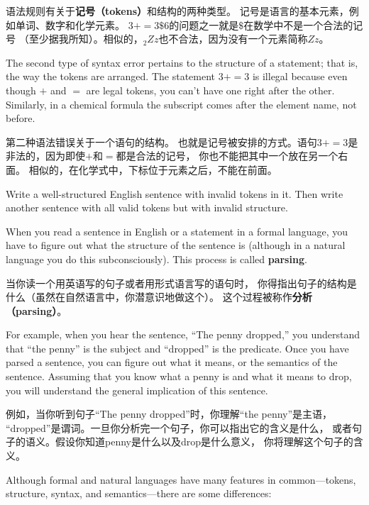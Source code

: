 \documentclass[10pt]{book}
\begin{document}
\begin{CJK}{UTF8}{gbsn}
语法规则有关于{\bf 记号（tokens）}和结构的两种类型。
记号是语言的基本元素，例如单词、数字和化学元素。
$3 + = 3 \mbox{\$} 6$的问题之一就是\( \$ \)在数学中不是一个合法的记号
（至少据我所知）。相似的，$_2Zz$也不合法，因为没有一个元素简称$Zz$。

The second type of syntax error pertains to the structure of a
statement; that is, the way the tokens are arranged.  The statement
$3 + = 3$ is illegal because even though $+$ and $=$ are
legal tokens, you can't have one right after the other.  Similarly,
in a chemical formula the subscript comes after the element name, not
before.

第二种语法错误关于一个语句的结构。
也就是记号被安排的方式。语句$3 + = 3$是非法的，因为即使$+$和$=$都是合法的记号，
你也不能把其中一个放在另一个右面。
相似的，在化学式中，下标位于元素之后，不能在前面。

\begin{exercise}

Write a well-structured English
sentence with invalid tokens in it.  Then write another sentence
with all valid tokens but with invalid structure.

\end{exercise}

When you read a sentence in English or a statement in a formal
language, you have to figure out what the structure of the sentence is
(although in a natural language you do this subconsciously).  This
process is called {\bf parsing}.

当你读一个用英语写的句子或者用形式语言写的语句时，
你得指出句子的结构是什么（虽然在自然语言中，你潜意识地做这个）。
这个过程被称作{\bf 分析（parsing）}。

For example, when you hear the sentence, ``The penny dropped,'' you
understand that ``the penny'' is the subject and ``dropped'' is the
predicate.  Once you have parsed a sentence, you can figure out what it
means, or the semantics of the sentence.  Assuming that you know
what a penny is and what it means to drop, you will understand the
general implication of this sentence.

例如，当你听到句子``The penny dropped''时，你理解``the penny''是主语，
``dropped''是谓词。一旦你分析完一个句子，你可以指出它的含义是什么，
或者句子的语义。假设你知道penny是什么以及drop是什么意义，
你将理解这个句子的含义。

Although formal and natural languages have many features in
common---tokens, structure, syntax, and semantics---there are some
differences:


\end{CJK}
\end{document}
